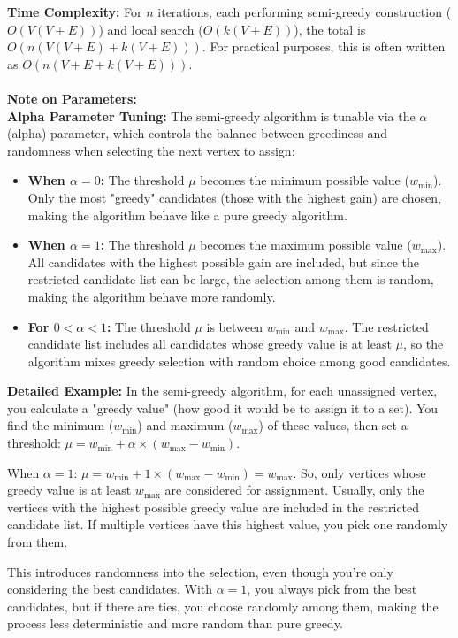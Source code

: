 \documentclass[11pt]{article}
\begin{document}
\textbf{Time Complexity:} For $n$ iterations, each performing semi-greedy construction ($O(V(V+E))$) and local search ($O(k(V+E))$), the total is $O(n(V(V+E) + k(V+E)))$. For practical purposes, this is often written as $O(n(V+E + k(V+E)))$.
\\
\\
\textbf{Note on Parameters:}
\\
\textbf{Alpha Parameter Tuning:}
The semi-greedy algorithm is tunable via the $\alpha$ (alpha) parameter, which controls the balance between greediness and randomness when selecting the next vertex to assign:

\begin{itemize}
\item \textbf{When $\alpha = 0$:} The threshold $\mu$ becomes the minimum possible value ($w_{\min}$). Only the most "greedy" candidates (those with the highest gain) are chosen, making the algorithm behave like a pure greedy algorithm.

\item \textbf{When $\alpha = 1$:} The threshold $\mu$ becomes the maximum possible value ($w_{\max}$). All candidates with the highest possible gain are included, but since the restricted candidate list can be large, the selection among them is random, making the algorithm behave more randomly.

\item \textbf{For $0 < \alpha < 1$:} The threshold $\mu$ is between $w_{\min}$ and $w_{\max}$. The restricted candidate list includes all candidates whose greedy value is at least $\mu$, so the algorithm mixes greedy selection with random choice among good candidates.
\end{itemize}

\textbf{Detailed Example:}
In the semi-greedy algorithm, for each unassigned vertex, you calculate a "greedy value" (how good it would be to assign it to a set). You find the minimum ($w_{\min}$) and maximum ($w_{\max}$) of these values, then set a threshold: $\mu = w_{\min} + \alpha \times (w_{\max} - w_{\min})$.

When $\alpha = 1$: $\mu = w_{\min} + 1 \times (w_{\max} - w_{\min}) = w_{\max}$. So, only vertices whose greedy value is at least $w_{\max}$ are considered for assignment. Usually, only the vertices with the highest possible greedy value are included in the restricted candidate list. If multiple vertices have this highest value, you pick one randomly from them.

This introduces randomness into the selection, even though you're only considering the best candidates. With $\alpha = 1$, you always pick from the best candidates, but if there are ties, you choose randomly among them, making the process less deterministic and more random than pure greedy.
\end{document}
